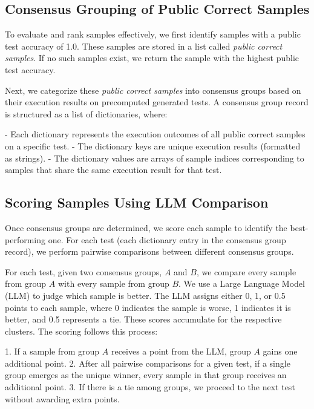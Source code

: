 \iffalse
\subsection{Consensus Grouping of Public Correct Samples}
\label{sec:consensus_grouping}

To evaluate and rank samples effectively, we first identify samples with a public test accuracy of 1.0. These samples are stored in a list called \textit{public correct samples}. If no such samples exist, we return the sample with the highest public test accuracy.

Next, we categorize these \textit{public correct samples} into consensus groups based on their execution results on precomputed generated tests. A consensus group record is structured as a list of dictionaries, where:

- Each dictionary represents the execution outcomes of all public correct samples on a specific test.
- The dictionary keys are unique execution results (formatted as strings).
- The dictionary values are arrays of sample indices corresponding to samples that share the same execution result for that test.

\subsection{Scoring Samples Using LLM Comparison}
\label{sec:scoring_samples}

Once consensus groups are determined, we score each sample to identify the best-performing one. For each test (each dictionary entry in the consensus group record), we perform pairwise comparisons between different consensus groups.

For each test, given two consensus groups, \( A \) and \( B \), we compare every sample from group \( A \) with every sample from group \( B \). We use a Large Language Model (LLM) to judge which sample is better. The LLM assigns either 0, 1, or 0.5 points to each sample, where 0 indicates the sample is worse, 1 indicates it is better, and 0.5 represents a tie. These scores accumulate for the respective clusters. The scoring follows this process:

1. If a sample from group \( A \) receives a point from the LLM, group \( A \) gains one additional point.
2. After all pairwise comparisons for a given test, if a single group emerges as the unique winner, every sample in that group receives an additional point.
3. If there is a tie among groups, we proceed to the next test without awarding extra points.

